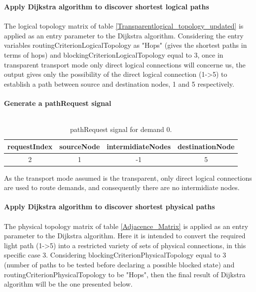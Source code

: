 \textbf{Apply Dijkstra algorithm to discover shortest logical paths}\\ \\

The logical topology matrix of table \ref{Transparentlogical_topology_updated} is applied as an entry parameter to the Dijkstra algorithm. Considering the entry variables routingCriterionLogicalTopology as "Hops" (gives the shortest paths in terms of hops) and blockingCriterionLogicalTopology equal to 3, once in transparent transport mode only direct logical connections will concerne us, the output gives only the possibility of the direct logical connection (1->5) to establish a path between source and destination nodes, 1 and 5 respectively.\\ \\

\textbf{Generate a pathRequest signal}\\ \\

\begin{table}[H]
	\centering
	\begin{tabular}{|c|c|c|c|}
		\hline
		requestIndex & sourceNode & intermidiateNodes & destinationNode \\ \hline
		2            & 1          & -1                 & 5               \\ \hline
	\end{tabular}  
	\caption{pathRequest signal for demand 0.}
\end{table} 

As the transport mode assumed is the transparent, only direct logical connections are used to route demands, and consequently there are no intermidiate nodes.\\ \\

\textbf{Apply Dijkstra algorithm to discover shortest physical paths}\\ \\
The physical topology matrix of table \ref{Adjacence_Matrix} is applied as an entry parameter to the Dijkstra algorithm. Here it is intended to convert the required light path (1->5) into a restricted variety of sets of physical connections, in this specific case 3. Considering blockingCriterionPhysicalTopology equal to 3 (number of paths to be tested before declaring a possible blocked state) and routingCriterionPhysicalTopology to be "Hops", then the final result of Dijkstra algorithm will be the one presented below.




